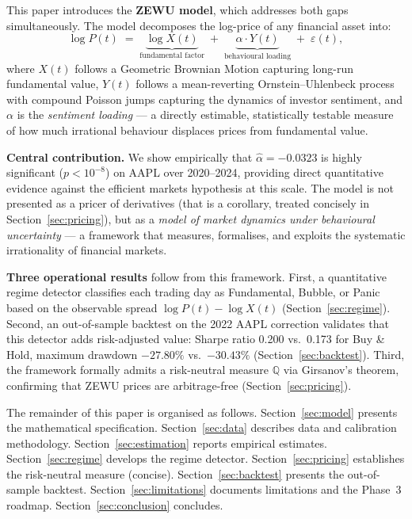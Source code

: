 \documentclass[12pt,a4paper]{article}
\theoremstyle{definition}
\theoremstyle{remark}
\newcommand{\Q}{\mathbb{Q}}
\begin{document}
This paper introduces the \textbf{ZEWU model}, which addresses both
gaps simultaneously. The model decomposes the log-price of any financial
asset into:
\begin{equation}
  \log P(t) \;=\; \underbrace{\log X(t)}_{\text{fundamental factor}}
             \;+\; \underbrace{\alpha \cdot Y(t)}_{\text{behavioural loading}}
             \;+\; \varepsilon(t),
  \label{eq:obs_intro}
\end{equation}
where $X(t)$ follows a Geometric Brownian Motion capturing long-run
fundamental value, $Y(t)$ follows a mean-reverting Ornstein--Uhlenbeck
process with compound Poisson jumps capturing the dynamics of investor
sentiment, and $\alpha$ is the \emph{sentiment loading} --- a directly
estimable, statistically testable measure of how much irrational
behaviour displaces prices from fundamental value.

\textbf{Central contribution.} We show empirically that $\hat{\alpha}
= -0.0323$ is highly significant ($p < 10^{-8}$) on AAPL over
2020--2024, providing direct quantitative evidence against the efficient
markets hypothesis at this scale. The model is not presented as a pricer
of derivatives (that is a corollary, treated concisely in
Section~\ref{sec:pricing}), but as a \emph{model of market dynamics
under behavioural uncertainty} --- a framework that measures, formalises,
and exploits the systematic irrationality of financial markets.

\textbf{Three operational results} follow from this framework.
First, a quantitative regime detector classifies each trading day as
Fundamental, Bubble, or Panic based on the observable spread
$\log P(t) - \log X(t)$ (Section~\ref{sec:regime}). Second, an
out-of-sample backtest on the 2022 AAPL correction validates that this
detector adds risk-adjusted value: Sharpe ratio 0.200 vs.\ 0.173 for
Buy \& Hold, maximum drawdown $-27.80\%$ vs.\ $-30.43\%$
(Section~\ref{sec:backtest}). Third, the framework formally admits a
risk-neutral measure $\Q$ via Girsanov's theorem, confirming that ZEWU
prices are arbitrage-free (Section~\ref{sec:pricing}).

The remainder of this paper is organised as follows.
Section~\ref{sec:model} presents the mathematical specification.
Section~\ref{sec:data} describes data and calibration methodology.
Section~\ref{sec:estimation} reports empirical estimates.
Section~\ref{sec:regime} develops the regime detector.
Section~\ref{sec:pricing} establishes the risk-neutral measure (concise).
Section~\ref{sec:backtest} presents the out-of-sample backtest.
Section~\ref{sec:limitations} documents limitations and the Phase~3
roadmap. Section~\ref{sec:conclusion} concludes.
\end{document}
